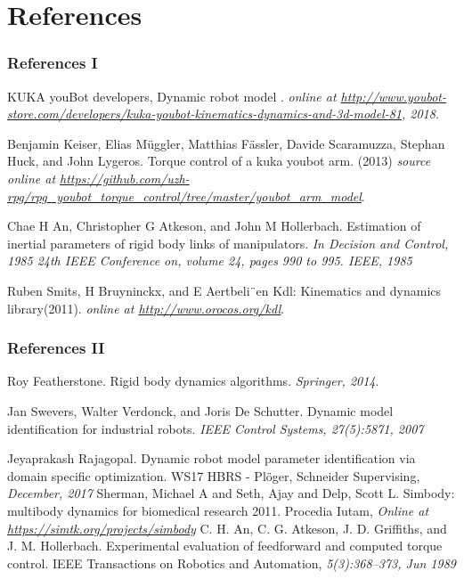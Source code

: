 \documentclass{beamer}
\begin{document}
\section{References}
\begin{frame}
	\frametitle{References I}
	\footnotesize{
	\begin{thebibliography}{99} 
	 KUKA youBot developers, Dynamic robot model . \emph{online at \url{http://www.youbot-store.com/developers/kuka-youbot-kinematics-dynamics-and-3d-model-81}, 2018}.

	 Benjamin Keiser,  Elias M\"uggler, Matthias F\"assler, Davide Scaramuzza, Stephan Huck, and John Lygeros. Torque control of a kuka youbot arm.  (2013) \emph{source online at \url{https://github.com/uzh-rpg/rpg_youbot_torque_control/tree/master/youbot_arm_model}}.
	
	 Chae H An, Christopher G Atkeson, and John M Hollerbach. Estimation of inertial parameters of rigid body links of manipulators. \emph{In Decision and Control, 1985 24th IEEE Conference on, volume 24, pages 990 to 995. IEEE, 1985}
		
	 Ruben Smits, H Bruyninckx, and E Aertbeli¨en Kdl: Kinematics and dynamics library(2011).
	\emph{online at \url{http://www.orocos.org/kdl}}.

	\end{thebibliography}
	}
\end{frame}

\begin{frame}
	\frametitle{References II}
	\footnotesize{
	\begin{thebibliography}{99} 

	 Roy Featherstone. Rigid body dynamics algorithms. 
	\emph{Springer, 2014}.
	
	 Jan Swevers, Walter Verdonck, and Joris De Schutter. Dynamic model identification for industrial robots. \emph{IEEE Control Systems, 27(5):58{71, 2007}}
		
	 Jeyaprakash Rajagopal. Dynamic robot model parameter identification via domain specific optimization. WS17 HBRS - Pl\"oger, Schneider Supervising, \emph{December, 2017}
	 Sherman, Michael A and Seth, Ajay and Delp, Scott L. Simbody: multibody dynamics for biomedical research 2011. Procedia Iutam, \emph{Online at \url{https://simtk.org/projects/simbody}}
	 C. H. An, C. G. Atkeson, J. D. Griffiths, and J. M. Hollerbach. Experimental evaluation of feedforward and computed torque control. IEEE Transactions on Robotics and Automation, \emph{5(3):368–373, Jun 1989}
\end{thebibliography}
	}
\end{frame}
\end{document}
